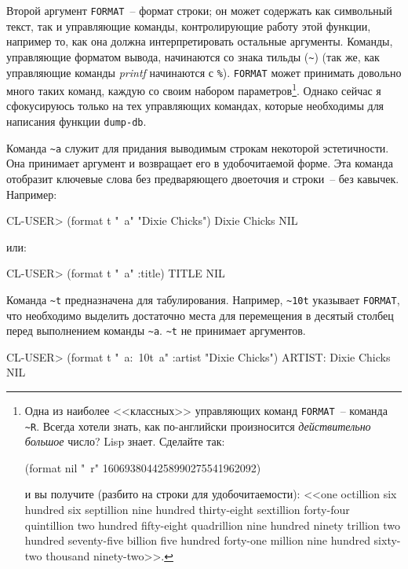 Второй аргумент \lstinline{FORMAT}~-- формат строки; он может содержать как символьный текст,
так и управляющие команды, контролирующие работу этой функции, например то, как она должна
интерпретировать остальные аргументы. Команды, управляющие форматом вывода, начинаются со
знака тильды (\lstinline!~!) (так же, как управляющие команды \textit{printf} начинаются с
\lstinline{%}). \lstinline{FORMAT} может принимать довольно много таких команд, каждую со
своим набором параметров\footnote{Одна из наиболее <<классных>> управляющих команд
  \lstinline{FORMAT}~-- команда \lstinline{~R}. Всегда хотели знать, как по-английски произносится
  \textit{действительно большое} число? Lisp знает. Сделайте так:

\begin{myverb}
(format nil "~r" 1606938044258990275541962092)
\end{myverb}

\noindent{}и вы получите (разбито на строки для удобочитаемости): <<one octillion six hundred six
septillion nine hundred thirty-eight sextillion forty-four quintillion two hundred
fifty-eight quadrillion nine hundred ninety trillion two hundred seventy-five billion five
hundred forty-one million nine hundred sixty-two thousand ninety-two>>.}. Однако сейчас я
сфокусируюсь только на тех управляющих командах, которые необходимы для написания функции
\lstinline{dump-db}.

Команда \lstinline{~a} служит для придания выводимым строкам некоторой эстетичности. Она
принимает аргумент и возвращает его в удобочитаемой форме. Эта команда отобразит ключевые
слова без предваряющего двоеточия и строки~-- без кавычек. Например:

\begin{myverb}
CL-USER> (format t "~a" "Dixie Chicks")
Dixie Chicks
NIL
\end{myverb}

\noindent{}или:

\begin{myverb}
CL-USER> (format t "~a" :title)
TITLE
NIL
\end{myverb}

Команда \lstinline{~t} предназначена для табулирования. Например, \lstinline{~10t} указывает
\lstinline{FORMAT}, что необходимо выделить достаточно места для перемещения в десятый столбец
перед выполнением команды \lstinline{~a}. \lstinline{~t} не принимает аргументов.

\begin{myverb}
CL-USER> (format t "~a:~10t~a" :artist "Dixie Chicks")
ARTIST:   Dixie Chicks
NIL
\end{myverb}

